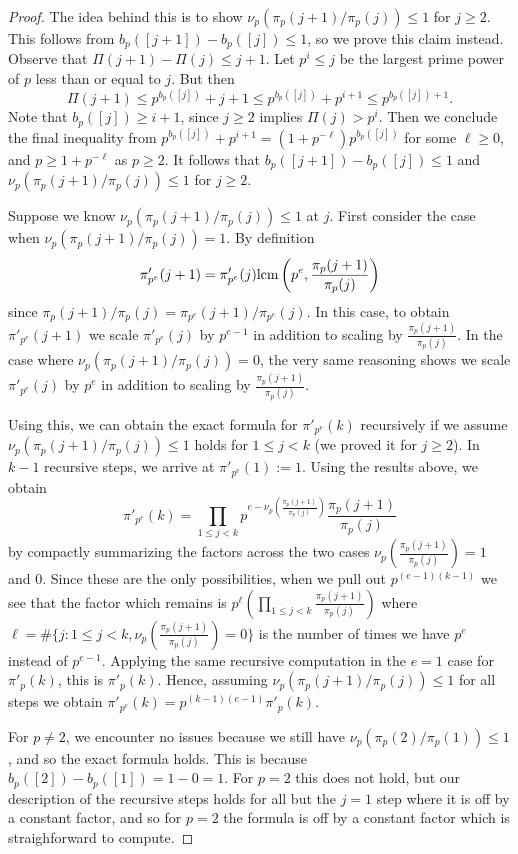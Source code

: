 \documentclass[12pt]{article}
\newcommand{\lcm}{\textup{lcm}}
\begin{document}
\begin{proof} The idea behind this is to show $\nu_p(\pi_p(j+1)/\pi_p(j))\le 1$ for $j\ge 2$. This follows from $b_p([j+1])-b_p([j])\le 1$, so we prove this claim instead. Observe that $\Pi(j+1)-\Pi(j)\le j+1$. Let $p^i \le j$ be the largest prime power of $p$ less than or equal to $j$. But then 
\[\Pi(j+1) \le p^{b_p([j])} + j+1 \le p^{b_p([j])}+p^{i+1} \le p^{b_p([j])+1}.\]
Note that $b_p([j]) \ge i+1$, since $j\ge 2$ implies $\Pi(j)>p^i$. Then we conclude the final inequality from $p^{b_p([j])}+p^{i+1} = (1+p^{-\ell})p^{b_p([j])}$ for some $\ell \ge 0$, and $p\ge 1+p^{-\ell}$ as $p\ge 2$. It follows that $b_p([j+1])-b_p([j])\le 1$ and $\nu_p(\pi_p(j+1)/\pi_p(j))\le 1$ for $j\ge 2$.

Suppose we know $\nu_p(\pi_p(j+1)/\pi_p(j))\le 1$ at $j$. First consider the case when $\nu_p(\pi_p(j+1)/\pi_p(j)) = 1$. By definition 
\[\pi'_{p^e}(j+1) = \pi'_{p^e}(j) \lcm \left(p^e, \frac{\pi_p(j+1)}{\pi_p(j)}\right)\]
since $\pi_p(j+1)/\pi_p(j) = \pi_{p^e}(j+1)/\pi_{p^e}(j)$. In this case, to obtain $\pi'_{p^e}(j+1)$ we scale $\pi'_{p^e}(j)$ by $p^{e-1}$ in addition to scaling by $\frac{\pi_p(j+1)}{\pi_p(j)}$. In the case where $\nu_p(\pi_p(j+1)/\pi_p(j)) = 0$, the very same reasoning shows we scale $\pi'_{p^e}(j)$ by $p^{e}$ in addition to scaling by $\frac{\pi_p(j+1)}{\pi_p(j)}$. 

Using this, we can obtain the exact formula for $\pi'_{p^e}(k)$ recursively if we assume $\nu_p(\pi_p(j+1)/\pi_p(j))\le 1$ holds for $1\le j < k$ (we proved it for $j\ge 2$). In $k-1$ recursive steps, we arrive at $\pi'_{p^e}(1):=1$. Using the results above, we obtain 
\[\pi'_{p^e}(k) = \prod_{1\le j<k} p^{e-\nu_p\left(\frac{\pi_p(j+1)}{\pi_p(j)}\right)} \frac{\pi_p(j+1)}{\pi_p(j)}\]
by compactly summarizing the factors across the two cases $\nu_p\left(\frac{\pi_p(j+1)}{\pi_p(j)}\right)=1$ and $0$. Since these are the only possibilities, when we pull out $p^{(e-1)(k-1)}$ we see that the factor which remains is $p^\ell (\prod_{1\le j < k}\frac{\pi_p(j+1)}{\pi_p(j)})$ where $\ell = \#\{j: 1\le j < k, \nu_p\left( \frac{\pi_p(j+1)}{\pi_p(j)}\right)=0\}$ is the number of times we have $p^e$ instead of $p^{e-1}$. Applying the same recursive computation in the $e=1$ case for $\pi'_p(k)$, this is $\pi'_p(k)$. Hence, assuming $\nu_p(\pi_p(j+1)/\pi_p(j))\le 1$ for all steps we obtain $\pi'_{p^e}(k) = p^{(k-1)(e-1)}\pi'_p(k)$.

For $p\neq 2$, we encounter no issues because we still have $\nu_p(\pi_p(2)/\pi_p(1))\le 1$, and so the exact formula holds. This is because $b_p([2])-b_p([1])=1-0=1$. For $p=2$ this does not hold, but our description of the recursive steps holds for all but the $j=1$ step where it is off by a constant factor, and so for $p=2$ the formula is off by a constant factor which is straighforward to compute.
\end{proof}
\end{document}
